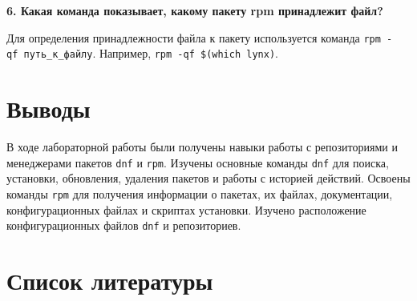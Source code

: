 \documentclass[
  english,
  russian,
  12pt,
  a4paper,
  DIV=11,
  numbers=noendperiod]{scrreprt}
\newcounter{none} %
\begin{document}
\textbf{6. Какая команда показывает, какому пакету rpm принадлежит
файл?}

Для определения принадлежности файла к пакету используется команда
\texttt{rpm\ -qf\ путь\_к\_файлу}. Например,
\texttt{rpm\ -qf\ \$(which\ lynx)}.

\chapter{Выводы}\label{ux432ux44bux432ux43eux434ux44b}

В ходе лабораторной работы были получены навыки работы с репозиториями и
менеджерами пакетов \texttt{dnf} и \texttt{rpm}. Изучены основные
команды \texttt{dnf} для поиска, установки, обновления, удаления пакетов
и работы с историей действий. Освоены команды \texttt{rpm} для получения
информации о пакетах, их файлах, документации, конфигурационных файлах и
скриптах установки. Изучено расположение конфигурационных файлов
\texttt{dnf} и репозиториев.

\chapter*{Список
литературы}\label{ux441ux43fux438ux441ux43eux43a-ux43bux438ux442ux435ux440ux430ux442ux443ux440ux44b}

\printbibliography[heading=none]
\end{document}
